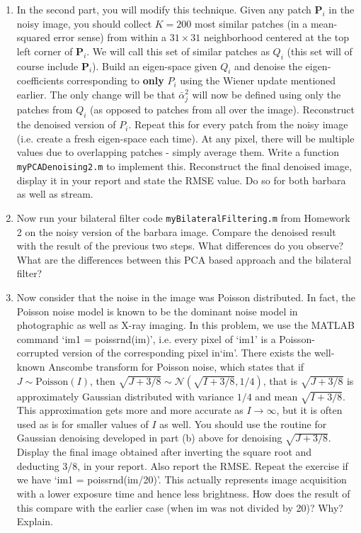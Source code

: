 \documentclass[11pt]{article}
\begin{document}
\begin{enumerate}
\begin{enumerate}
\item In the second part, you will modify this technique. Given any patch $\mathbf{P}_i$ in the noisy image, you should collect $K = 200$ most similar patches (in a mean-squared error sense) from within a $31 \times 31$ neighborhood centered at the top left corner of $\mathbf{P}_i$. We will call this set of similar patches as $Q_i$ (this set will of course include $\mathbf{P}_i$). Build an eigen-space given $Q_i$ and denoise the eigen-coefficients corresponding to \textbf{only} $P_i$ using the Wiener update mentioned earlier. The only change will be that $\bar{\alpha}^2_j$ will now be defined using only the patches from $Q_i$ (as opposed to patches from all over the image). Reconstruct the denoised version of $P_i$. Repeat this for every patch from the noisy image (i.e. create a fresh eigen-space each time). At any pixel, there will be multiple values due to overlapping patches - simply average them. Write a function \texttt{myPCADenoising2.m} to implement this. Reconstruct the final denoised image, display it in your report and state the RMSE value. Do so for both barbara as well as stream.
\item Now run your bilateral filter code \texttt{myBilateralFiltering.m} from Homework 2 on the noisy version of the barbara image. Compare the denoised result with the result of the previous two steps. What differences do you observe? What are the differences between this PCA based approach and the bilateral filter? 

\item Now consider that the noise in the image was Poisson distributed. In fact, the Poisson noise model is known to be the dominant noise model in photographic as well as X-ray imaging. In this problem, we use the MATLAB command `im1 = poissrnd(im)', i.e. every pixel of `im1' is a Poisson-corrupted version of the corresponding pixel in`im'. There exists the well-known Anscombe transform for Poisson noise, which states that if $J \sim \textrm{Poisson}(I)$, then $\sqrt{J+3/8} \sim \mathcal{N}(\sqrt{I+3/8},1/4)$, that is $\sqrt{J+3/8}$ is approximately Gaussian distributed with variance $1/4$ and mean $\sqrt{I+3/8}$. This approximation gets more and more accurate as $I \rightarrow \infty$, but it is often used as is for smaller values of $I$ as well. You should use the routine for Gaussian denoising developed in part (b) above for denoising $\sqrt{J+3/8}$. Display the final image obtained after inverting the square root and deducting 3/8, in your report. Also report the RMSE. Repeat the exercise if we have `im1 = poissrnd(im/20)'. This actually represents image acquisition with a lower exposure time and hence less brightness. How does the result of this compare with the earlier case (when im was not divided by 20)? Why? Explain. 


\end{enumerate}
\end{enumerate}
\end{document}

